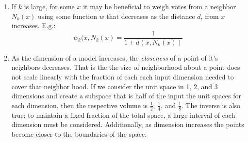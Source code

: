 \documentclass{report}
\begin{document}
\begin{enumerate}
\begin{enumerate}
			\item If $k$ is large, for some $x$ it may be beneficial to weigh votes from a neighbor $N_k(x)$ using some function $w$ that decreases as the distance $d$, from $x$ increases. E.g.:
			\begin{equation*}
				w_{k}(x,N_k(x) = \frac{1}{1 + d(x,N_k(x) )}
			\end{equation*}
			\item As the dimension of a model increases, the \textit{closeness} of a point of it's neighbors decreases. That is the the size of neighborhood about a point does not scale linearly with the fraction of each each input dimension needed to cover that neighbor hood. If we consider the unit space in 1, 2, and 3 dimensions and create a subspace that is half of the input the unit spaces for each dimension, then the respective volume is $\frac{1}{2}$, $\frac{1}{4}$, and $\frac{1}{8}$. The inverse is also true; to maintain a fixed fraction of the total space, a large interval of each dimension must be considered. Additionally, as dimension increases the points become closer to the boundaries of the space.  
		\end{enumerate}
		
	
\end{enumerate}
\end{document}
